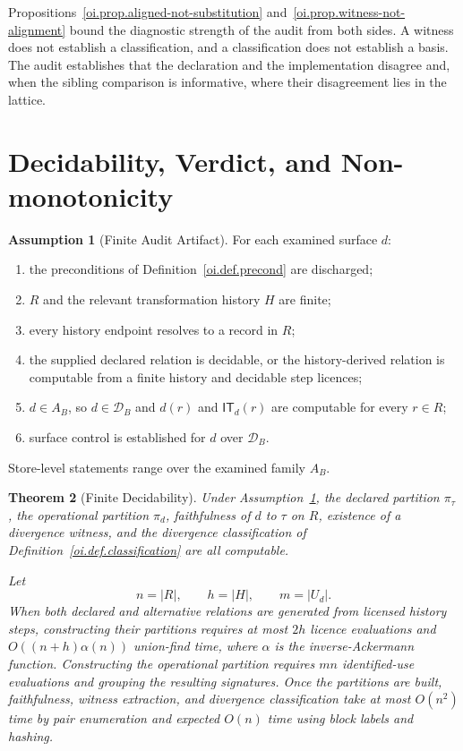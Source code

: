 \documentclass[11pt]{article}
\theoremstyle{plain}
\newtheorem{theorem}{Theorem}[section]
\theoremstyle{definition}
\newtheorem{assumption}[theorem]{Assumption}
\theoremstyle{remark}
\newcommand{\IT}{\ensuremath{\mathsf{IT}}}
\begin{document}
Propositions~\ref{oi.prop.aligned-not-substitution}
and~\ref{oi.prop.witness-not-alignment}
bound the diagnostic strength of the audit from both sides.
A witness does not establish a classification, and
a classification does not establish a basis.
The audit establishes that the declaration and the implementation
disagree and, when the sibling comparison is informative,
where their disagreement lies in the lattice.

\section{Decidability, Verdict, and Non-monotonicity}
\label{oi.sec.procedure}

\begin{assumption}[Finite Audit Artifact]
  \label{oi.asm.finite}
  For each examined surface \(d\):
  \begin{enumerate}[label=(\alph*)]
    \item the preconditions of Definition~\ref{oi.def.precond} are discharged;
    \item \(R\) and the relevant transformation history \(H\) are finite;
    \item every history endpoint resolves to a record in \(R\);
    \item the supplied declared relation is decidable,
          or the history-derived relation is computable
          from a finite history and decidable step licences;
    \item \(d\in A_B\), so \(d\in\mathcal{D}_B\)
          and \(d(r)\) and \(\IT_d(r)\) are computable for every \(r\in R\);
    \item surface control is established for \(d\) over \(\mathcal{D}_B\).
  \end{enumerate}
  Store-level statements range over the examined family \(A_B\).
\end{assumption}

\begin{theorem}[Finite Decidability]
  \label{oi.thm.decidable}
  Under Assumption~\ref{oi.asm.finite},
  the declared partition \(\pi_{\tau}\),
  the operational partition \(\pi_d\),
  faithfulness of \(d\) to \(\tau\) on \(R\),
  existence of a divergence witness,
  and the divergence classification of Definition~\ref{oi.def.classification}
  are all computable.

  Let
  \[
    n=|R|,
    \qquad
    h=|H|,
    \qquad
    m=|U_d|.
  \]
  When both declared and alternative relations are generated
  from licensed history steps, constructing their partitions
  requires at most \(2h\) licence evaluations
  and \(O((n+h)\alpha(n))\) union-find time,
  where \(\alpha\) is the inverse-Ackermann function.
  Constructing the operational partition requires \(mn\)
  identified-use evaluations and grouping the resulting signatures.
  Once the partitions are built,
  faithfulness, witness extraction, and divergence classification
  take at most \(O(n^2)\) time by pair enumeration
  and expected \(O(n)\) time using block labels and hashing.
\end{theorem}
\end{document}
